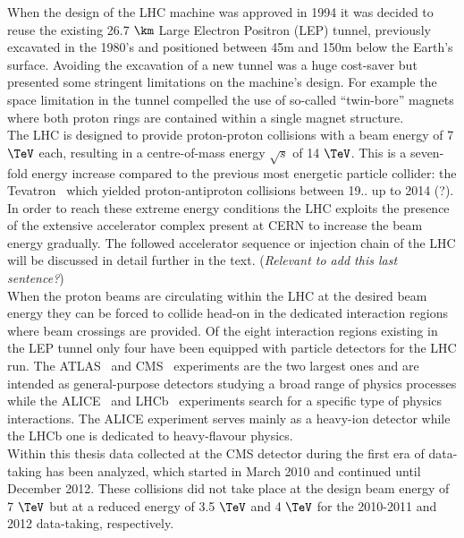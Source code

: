 When the design of the LHC machine was approved in 1994 it was decided to reuse the existing 26.7 $\km$ Large Electron Positron (LEP) tunnel, previously excavated in the 1980's and positioned between 45m and 150m below the Earth's surface.
Avoiding the excavation of a new tunnel was a huge cost-saver but presented some stringent limitations on the machine's design. For example the space limitation in the tunnel compelled the use of so-called ``twin-bore'' magnets where both proton rings are contained within a single magnet structure.
\\
The LHC is designed to provide proton-proton collisions with a beam energy of 7 $\TeV$ each, resulting in a centre-of-mass energy $\sqrt{s}$ of 14 $\TeV$. This is a seven-fold energy increase compared to the previous most energetic particle collider: the Tevatron~\cite{} which yielded proton-antiproton collisions between 19.. up to 2014 (?). In order to reach these extreme energy conditions the LHC exploits the presence of the extensive accelerator complex present at CERN to increase the beam energy gradually. The followed accelerator sequence or injection chain of the LHC will be discussed in detail further in the text. (\textit{Relevant to add this last sentence?})
\\
When the proton beams are circulating within the LHC at the desired beam energy they can be forced to collide head-on in the dedicated interaction regions where beam crossings are provided. Of the eight interaction regions existing in the LEP tunnel only four have been equipped with particle detectors for the LHC run. The ATLAS~\cite{AtlasDetectorPaper} and CMS~\cite{CMSDetectorPaper} experiments are the two largest ones and are intended as general-purpose detectors studying a broad range of physics processes while the ALICE~\cite{AliceDetectorPaper} and LHCb~\cite{LHCbDetectorPaper} experiments search for a specific type of physics interactions. The ALICE experiment serves mainly as a heavy-ion detector while the LHCb one is dedicated to heavy-flavour physics.
\\
Within this thesis data collected at the CMS detector during the first era of data-taking has been analyzed, which started in March 2010 and continued until December 2012. These collisions did not take place at the design beam energy of 7 $\TeV$ but at a reduced energy of 3.5 $\TeV$ and 4 $\TeV$ for the 2010-2011 and 2012 data-taking, respectively.

